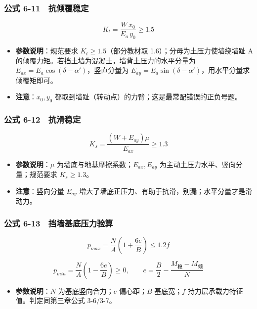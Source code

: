 \documentclass[
]{article}
\providecommand{\tightlist}{%
  \setlength{\itemsep}{0pt}\setlength{\parskip}{0pt}}
\begin{document}
\subsubsection{公式
6-11　抗倾覆稳定}\label{ux516cux5f0f-6-11-ux6297ux503eux8986ux7a33ux5b9a}

\[K_t=\frac{W\,x_0}{E_a\,y_0}\ge1.5\]

\begin{itemize}
\tightlist
\item
  \textbf{参数说明}：规范要求 \(K_t\ge1.5\)（部分教材取
  1.6）；分母为土压力使墙绕墙趾 A
  的倾覆力矩。若挡土墙为混凝土，墙背土压力的水平分量为
  \(E_{ax}=E_a\cos(\delta-\alpha')\)，竖直分量为
  \(E_{ay}=E_a\sin(\delta-\alpha')\)，用水平分量求倾覆矩即可。
\item
  \textbf{注意}：\(x_0,y_0\)
  都取到墙趾（转动点）的力臂；这是最常配错误的正负号题。
\end{itemize}

\subsubsection{公式
6-12　抗滑稳定}\label{ux516cux5f0f-6-12-ux6297ux6ed1ux7a33ux5b9a}

\[K_s=\frac{(W+E_{ay})\mu}{E_{ax}}\ge1.3\]

\begin{itemize}
\tightlist
\item
  \textbf{参数说明}：\(\mu\) 为墙底与地基摩擦系数；\(E_{ax},E_{ay}\)
  为主动土压力水平、竖向分量；规范要求 \(K_s\ge1.3\)。
\item
  \textbf{注意}：竖向分量 \(E_{ay}\)
  增大了墙底正压力、有助于抗滑，别漏；水平分量才是滑动力。
\end{itemize}

\subsubsection{公式
6-13　挡墙基底压力验算}\label{ux516cux5f0f-6-13-ux6321ux5899ux57faux5e95ux538bux529bux9a8cux7b97}

\[p_{max}=\frac{N}{A}\left(1+\frac{6e}{B}\right)\le1.2f\]

\[p_{min}=\frac{N}{A}\left(1-\frac{6e}{B}\right)\ge0,\qquad e=\frac{B}{2}-\frac{M_{\text{稳}}-M_{\text{倾}}}{N}\]

\begin{itemize}
\tightlist
\item
  \textbf{参数说明}：\(N\) 为基底竖向合力；\(e\) 偏心距；\(B\)
  基底宽；\(f\) 持力层承载力特征值。判定同第三章公式 3-6/3-7。
\end{itemize}
\end{document}

